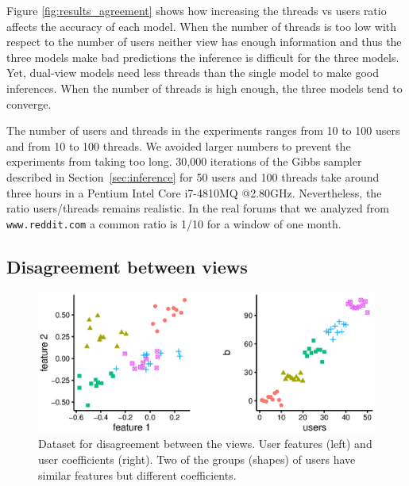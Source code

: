 \documentclass[smallextended]{svjour3}          %
\begin{document}
Figure \ref{fig:results_agreement} shows how increasing the threads vs users ratio affects the accuracy of each model. When the number of threads is too low with respect to the number of users neither view has enough information and thus the three models make bad predictions the inference is difficult for the three models. Yet, dual-view models need less threads than the single model to make good inferences. When the number of threads is high enough, the three models tend to converge.

The number of users and threads in the experiments ranges from 10 to 100 users and from 10 to 100 threads. We avoided larger numbers to prevent the experiments from taking too long. 30,000 iterations of the Gibbs sampler described in Section~\ref{sec:inference} for 50 users and 100 threads take around three hours in a Pentium Intel Core i7-4810MQ @2.80GHz. Nevertheless, the ratio users/threads remains realistic. In the real forums that we analyzed from \texttt{www.reddit.com} a common ratio is 1/10 for a window of one month.
\subsection{Disagreement between views}

\begin{figure}
	\centering
	\includegraphics[width=1\textwidth]{Fig4_data_disagreement_bw}
	\caption{Dataset for disagreement between the views. User features (left) and user coefficients (right). Two of the groups (shapes) of users have similar features but different coefficients.}
	\label{fig:data_disagreement}
\end{figure}
\end{document}
